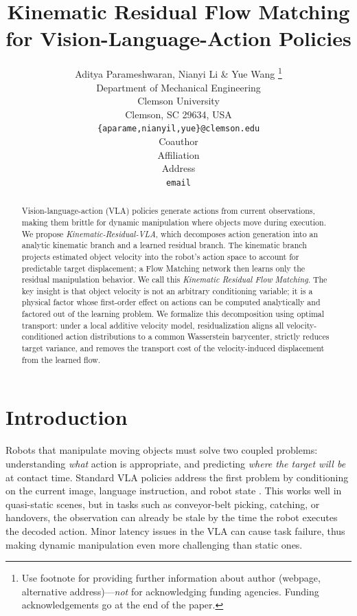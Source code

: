 \documentclass{article} %
\title{Kinematic Residual Flow Matching for Vision-Language-Action Policies}
\author{Aditya Parameshwaran, Nianyi Li \& Yue Wang \thanks{ Use footnote for providing further information
about author (webpage, alternative address)---\emph{not} for acknowledging
funding agencies.  Funding acknowledgements go at the end of the paper.} \\
Department of Mechanical Engineering\\
Clemson University\\
Clemson, SC 29634, USA \\
\texttt{\{aparame,nianyil,yue\}@clemson.edu} \\
\AND
Coauthor \\
Affiliation \\
Address \\
\texttt{email}
}
\begin{document}
\maketitle

\begin{abstract}
Vision-language-action (VLA) policies generate actions from current observations, making them brittle for dynamic manipulation where objects move during execution. We propose \emph{Kinematic-Residual-VLA}, which decomposes action generation into an analytic kinematic branch and a learned residual branch. The kinematic branch projects estimated object velocity into the robot's action space to account for predictable target displacement; a Flow Matching network then learns only the residual manipulation behavior. We call this \emph{Kinematic Residual Flow Matching}. The key insight is that object velocity is not an arbitrary conditioning variable; it is a physical factor whose first-order effect on actions can be computed analytically and factored out of the learning problem. We formalize this decomposition using optimal transport: under a local additive velocity model, residualization aligns all velocity-conditioned action distributions to a common Wasserstein barycenter, strictly reduces target variance, and removes the transport cost of the velocity-induced displacement from the learned flow.
\end{abstract}

\section{Introduction}
\label{sec:intro}

Robots that manipulate moving objects must solve two coupled problems: understanding \emph{what} action is appropriate, and predicting \emph{where the target will be} at contact time. Standard VLA policies address the first problem by conditioning on the current image, language instruction, and robot state \citep{brohan2023rt1,zitkovich2023rt2,kim2024openvla}. This works well in quasi-static scenes, but in tasks such as conveyor-belt picking, catching, or handovers, the observation can already be stale by the time the robot executes the decoded action. Minor latency issues in the VLA can cause task failure, thus making dynamic manipulation even more challenging than static ones.
\end{document}
